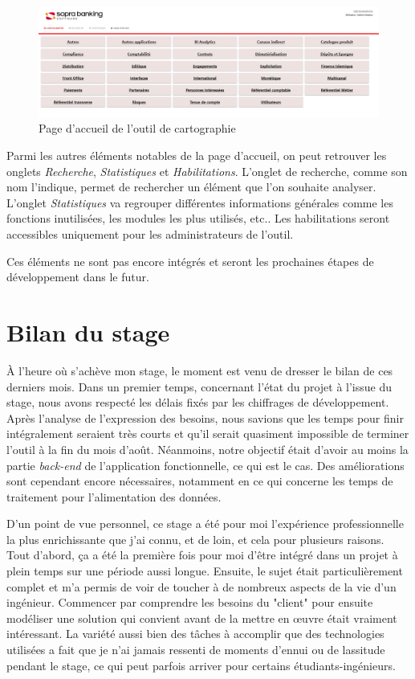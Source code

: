 \documentclass{polytech/polytech}
\begin{document}
\begin{figure}
	\includegraphics[scale=0.33]{images/cartoAccueil}
	\caption{Page d'accueil de l'outil de cartographie}
	\label{fig:cartoAccueil}
\end{figure}

Parmi les autres éléments notables de la page d'accueil, on peut retrouver les onglets \textit{Recherche}, \textit{Statistiques} et \textit{Habilitations}. L'onglet de recherche, comme son nom l'indique, permet de rechercher un élément que l'on souhaite analyser. L'onglet \textit{Statistiques} va regrouper différentes informations générales comme les fonctions inutilisées, les modules les plus utilisés, etc.. Les habilitations seront accessibles uniquement pour les administrateurs de l'outil. 

Ces éléments ne sont pas encore intégrés et seront les prochaines étapes de développement dans le futur. 

\chapter*{Bilan du stage}


À l'heure où s'achève mon stage, le moment est venu de dresser le bilan de ces derniers mois. Dans un premier temps, concernant l'état du projet à l'issue du stage, nous avons respecté les délais fixés par les chiffrages de développement. Après l'analyse de l'expression des besoins, nous savions que les temps pour finir intégralement seraient très courts et qu'il serait quasiment impossible de terminer l'outil à la fin du mois d'août. Néanmoins, notre objectif était d'avoir au moins la partie \textit{back-end} de l'application fonctionnelle, ce qui est le cas. Des améliorations sont cependant encore nécessaires, notamment en ce qui concerne les temps de traitement pour l'alimentation des données.

D'un point de vue personnel, ce stage a été pour moi l'expérience professionnelle la plus enrichissante que j'ai connu, et de loin, et cela pour plusieurs raisons. Tout d'abord, ça a été la première fois pour moi d'être intégré dans un projet à plein temps sur une période aussi longue. Ensuite, le sujet était particulièrement complet et m'a permis de voir de toucher à de nombreux aspects de la vie d'un ingénieur. Commencer par comprendre les besoins du "client" pour ensuite modéliser une solution qui convient avant de la mettre en œuvre était vraiment intéressant. La variété aussi bien des tâches à accomplir que des technologies utilisées a fait que je n'ai jamais ressenti de moments d'ennui ou de lassitude pendant le stage, ce qui peut parfois arriver pour certains étudiants-ingénieurs.
\end{document}

